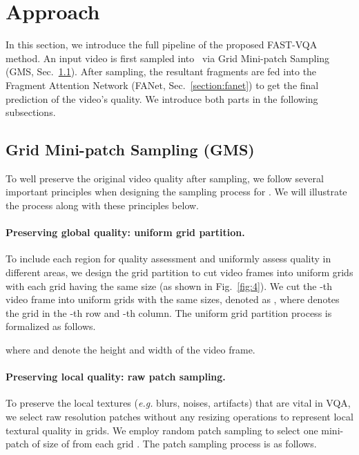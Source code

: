 \documentclass[runningheads]{llncs}
\begin{document}
\section{Approach}
\label{section:method}


In this section, we introduce the full pipeline of the proposed FAST-VQA method. An input video is first sampled into \frag~via Grid Mini-patch Sampling (GMS, Sec.~\ref{section:fragment}). After sampling, the resultant fragments are fed into the Fragment Attention Network (FANet, Sec.~\ref{section:fanet}) to get the final prediction of the video's quality. We introduce both parts in the following subsections.
  




\subsection{Grid Mini-patch Sampling (GMS)}\label{section:fragment}

To well preserve the original video quality after sampling, we follow several important principles when designing the sampling process for \frag. We will illustrate the process along with these principles below.

\paragraph{Preserving global quality: uniform grid partition.}  To include each region for quality assessment and uniformly assess quality in different areas, we design the grid partition to cut video frames into uniform grids with each grid having the same size (as shown in Fig.~\ref{fig:4}). We cut the -th video frame  into  uniform grids with the same sizes, denoted as , where  denotes the grid 
in the -th row and -th column. The uniform grid partition process is formalized as follows.

where  and  denote the height and width of the video frame.

\paragraph{Preserving local quality: raw patch sampling.} To preserve the local textures (\textit{e.g.} blurs, noises, artifacts) that are vital in VQA, we select raw resolution patches without any resizing operations to represent local textural quality in grids. We employ random patch sampling to select one mini-patch  of size of  from each grid . The patch sampling process is as follows.
\end{document}
